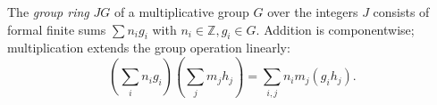 The \textit{group ring} $JG$ of a multiplicative group $G$ over the integers $J$ consists of formal finite sums $\sum n_i g_i$ with $n_i \in \mathbb{Z}, g_i \in G$. Addition is componentwise; multiplication extends the group operation linearly:
$$(\sum_i n_i g_i)(\sum_j m_j h_j) = \sum_{i,j} n_i m_j (g_i h_j).$$

